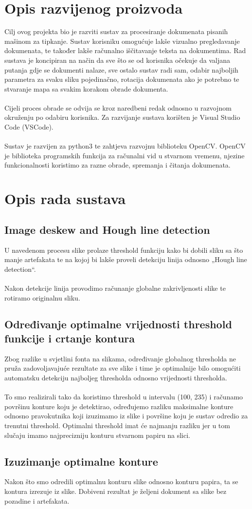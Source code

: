 \documentclass{article}
\begin{document}
\section{Opis razvijenog proizvoda}
Cilj ovog projekta bio je razviti sustav za procesiranje dokumenata pisanih mašinom za tipkanje. Sustav korisniku omogućuje lakše vizualno pregledavanje dokumenata, te također lakše računalno iščitavanje teksta na dokumentima. Rad sustava je koncipiran na način da sve što se od korisnika očekuje da valjana putanja gdje se dokumenti nalaze, sve ostalo sustav radi sam, odabir najboljih parametra za svaku sliku pojedinačno, rotacija dokumenata ako je potrebno te stvaranje mapa sa svakim korakom obrade dokumenta.\\
\\
Cijeli proces obrade se odvija se kroz naredbeni redak odnosno u razvojnom okruženju po odabiru korisnika. Za razvijanje sustava korišten je Visual Studio Code (VSCode).\\
\\
Sustav je razvijen za python3 te zahtjeva razvojnu biblioteku OpenCV. OpenCV je biblioteka programskih funkcija za računalni vid u stvarnom vremenu,  njezine funkcionalnosti koristimo za razne obrade, spremanja i čitanja dokumenata.

\section{Opis rada sustava}

\subsection{Image deskew and Hough line detection}

U navedenom procesu slike prolaze threshold funkciju kako bi dobili sliku sa što manje artefakata te na kojoj bi lakše proveli detekciju linija odnosno „Hough line detection“.\\ \\
Nakon detekcije linija provodimo računanje globalne zakrivljenosti slike te rotiramo originalnu sliku.

\subsection{Određivanje optimalne vrijednosti threshold funkcije i crtanje kontura}

Zbog razlike u svjetlini fonta na slikama, određivanje globalnog thresholda ne pruža zadovoljavajuće rezultate za sve slike i time je optimalnije bilo omogućiti automatsku detekciju najboljeg thresholda odnosno vrijednosti thresholda.\\ \\
To smo realizirali tako da koristimo threshold u intervalu (100, 235) i računamo površinu konture koju je detektirao, određujemo razliku maksimalne konture odnosno pravokutnika koji izuzimamo iz slike i površine koju je sustav odredio za trenutni threshold. Optimalni threshold imat će najmanju razliku jer u tom slučaju imamo najprecizniju konturu stvarnom papiru na slici.

\subsection{Izuzimanje optimalne konture}

Nakon što smo odredili optimalnu konturu slike odnosno konturu papira, ta se kontura izrezuje iz slike. Dobiveni rezultat je željeni dokument sa slike bez pozadine i artefakata.
\end{document}

